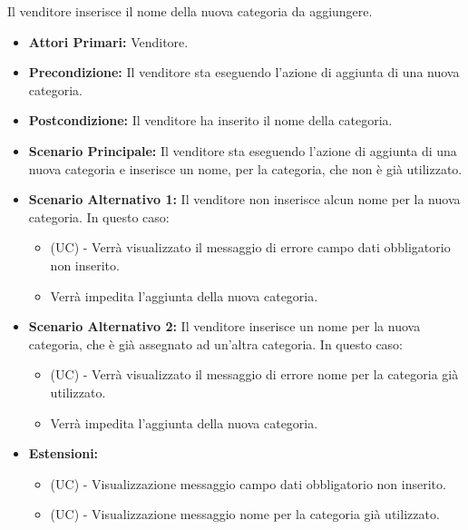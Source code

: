 Il venditore inserisce il nome della nuova categoria da aggiungere.
\begin{itemize}
    \item \textbf{Attori Primari:} Venditore.
    \item \textbf{Precondizione:} Il venditore sta eseguendo l'azione di aggiunta di una nuova categoria.
    \item \textbf{Postcondizione:} Il venditore ha inserito il nome della categoria.
    \item \textbf{Scenario Principale:} Il venditore sta eseguendo l'azione di aggiunta di una nuova categoria e inserisce un nome, per la categoria, che non è già utilizzato.
    \item \textbf{Scenario Alternativo 1:} Il venditore non inserisce alcun nome per la nuova categoria. In questo caso:
    \begin{itemize}
        \item (UC) - Verrà visualizzato il messaggio di errore campo dati obbligatorio non inserito.
        \item Verrà impedita l'aggiunta della nuova categoria.
    \end{itemize}
    \item \textbf{Scenario Alternativo 2:} Il venditore inserisce un nome per la nuova categoria, che è già assegnato ad un'altra categoria. In questo caso:
    \begin{itemize}
        \item (UC) - Verrà visualizzato il messaggio di errore nome per la categoria già utilizzato.
        \item Verrà impedita l'aggiunta della nuova categoria.
    \end{itemize}
    \item \textbf{Estensioni:}
    \begin{itemize}
        \item (UC) - Visualizzazione messaggio campo dati obbligatorio non inserito.
        \item (UC) - Visualizzazione messaggio nome per la categoria già utilizzato.
    \end{itemize}
\end{itemize}



